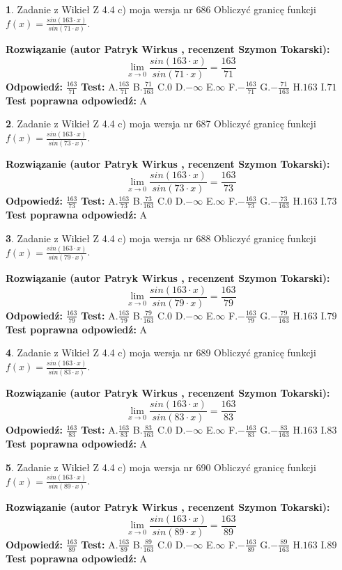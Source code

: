 \documentclass[12pt, a4paper]{article}
\theoremstyle{definition} %
\newtheorem{zad}{}
\newcommand{\zadStart}[1]{\begin{zad}#1\newline}
\newcommand{\zadStop}{\end{zad}}
\newcommand{\rozwStart}[2]{\noindent \textbf{Rozwiązanie (autor #1 , recenzent #2): }\newline}
\newcommand{\rozwStop}{\newline}
\newcommand{\odpStart}{\noindent \textbf{Odpowiedź:}\newline}
\newcommand{\odpStop}{\newline}
\newcommand{\testStart}{\noindent \textbf{Test:}\newline}
\newcommand{\testStop}{\newline}
\newcommand{\kluczStart}{\noindent \textbf{Test poprawna odpowiedź:}\newline}
\newcommand{\kluczStop}{\newline}
\begin{document}
\zadStart{Zadanie z Wikieł Z 4.4 c) moja wersja nr 686}
Obliczyć granicę funkcji $f(x)=\frac{sin(163\cdot x)}{sin(71\cdot x)}$.
\zadStop
\rozwStart{Patryk Wirkus}{Szymon Tokarski}
$$\lim\limits_{x\to 0}\frac{sin(163\cdot x)}{sin(71\cdot x)}=
\frac{163}{71}$$
\rozwStop
\odpStart
$\frac{163}{71}$
\odpStop
\testStart
A.$\frac{163}{71}$
B.$\frac{71}{163}$
C.$0$
D.$-\infty$
E.$\infty$
F.$-\frac{163}{71}$
G.$-\frac{71}{163}$
H.$163$
I.$71$
\testStop
\kluczStart
A
\kluczStop



\zadStart{Zadanie z Wikieł Z 4.4 c) moja wersja nr 687}
Obliczyć granicę funkcji $f(x)=\frac{sin(163\cdot x)}{sin(73\cdot x)}$.
\zadStop
\rozwStart{Patryk Wirkus}{Szymon Tokarski}
$$\lim\limits_{x\to 0}\frac{sin(163\cdot x)}{sin(73\cdot x)}=
\frac{163}{73}$$
\rozwStop
\odpStart
$\frac{163}{73}$
\odpStop
\testStart
A.$\frac{163}{73}$
B.$\frac{73}{163}$
C.$0$
D.$-\infty$
E.$\infty$
F.$-\frac{163}{73}$
G.$-\frac{73}{163}$
H.$163$
I.$73$
\testStop
\kluczStart
A
\kluczStop



\zadStart{Zadanie z Wikieł Z 4.4 c) moja wersja nr 688}
Obliczyć granicę funkcji $f(x)=\frac{sin(163\cdot x)}{sin(79\cdot x)}$.
\zadStop
\rozwStart{Patryk Wirkus}{Szymon Tokarski}
$$\lim\limits_{x\to 0}\frac{sin(163\cdot x)}{sin(79\cdot x)}=
\frac{163}{79}$$
\rozwStop
\odpStart
$\frac{163}{79}$
\odpStop
\testStart
A.$\frac{163}{79}$
B.$\frac{79}{163}$
C.$0$
D.$-\infty$
E.$\infty$
F.$-\frac{163}{79}$
G.$-\frac{79}{163}$
H.$163$
I.$79$
\testStop
\kluczStart
A
\kluczStop



\zadStart{Zadanie z Wikieł Z 4.4 c) moja wersja nr 689}
Obliczyć granicę funkcji $f(x)=\frac{sin(163\cdot x)}{sin(83\cdot x)}$.
\zadStop
\rozwStart{Patryk Wirkus}{Szymon Tokarski}
$$\lim\limits_{x\to 0}\frac{sin(163\cdot x)}{sin(83\cdot x)}=
\frac{163}{83}$$
\rozwStop
\odpStart
$\frac{163}{83}$
\odpStop
\testStart
A.$\frac{163}{83}$
B.$\frac{83}{163}$
C.$0$
D.$-\infty$
E.$\infty$
F.$-\frac{163}{83}$
G.$-\frac{83}{163}$
H.$163$
I.$83$
\testStop
\kluczStart
A
\kluczStop



\zadStart{Zadanie z Wikieł Z 4.4 c) moja wersja nr 690}
Obliczyć granicę funkcji $f(x)=\frac{sin(163\cdot x)}{sin(89\cdot x)}$.
\zadStop
\rozwStart{Patryk Wirkus}{Szymon Tokarski}
$$\lim\limits_{x\to 0}\frac{sin(163\cdot x)}{sin(89\cdot x)}=
\frac{163}{89}$$
\rozwStop
\odpStart
$\frac{163}{89}$
\odpStop
\testStart
A.$\frac{163}{89}$
B.$\frac{89}{163}$
C.$0$
D.$-\infty$
E.$\infty$
F.$-\frac{163}{89}$
G.$-\frac{89}{163}$
H.$163$
I.$89$
\testStop
\kluczStart
A
\kluczStop
\end{document}
